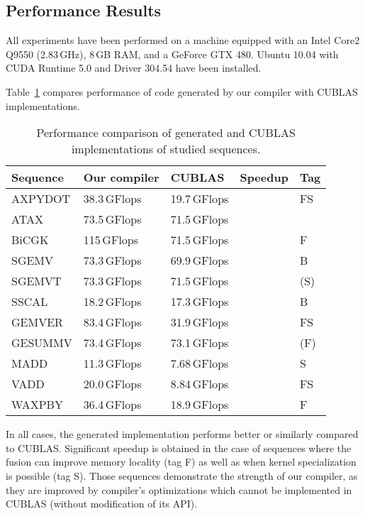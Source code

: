 \documentclass[final]{siamltex}
\begin{document}
{\subsection{Performance Results}

All experiments have been performed on a machine equipped with an Intel Core2 Q9550 (2.83\,GHz), 8\,GB RAM, and a GeForce GTX 480. Ubuntu 10.04 with CUDA Runtime 5.0 and Driver 304.54 have been installed.

Table~\ref{tab:perf} compares performance of code generated by our compiler with CUBLAS implementations.

\begin{table}
        \centering
	\small
        \begin{tabular}{|l|l|l|l|l|}
                \hline
                Sequence & Our compiler & CUBLAS & Speedup & Tag \\
		\hline
                AXPYDOT & 38.3\,GFlops & 19.7\,GFlops &  & FS \\
                ATAX & 73.5\,GFlops & 71.5\,GFlops &  &  \\
                BiCGK & 115\,GFlops & 71.5\,GFlops &  & F \\
                SGEMV & 73.3\,GFlops & 69.9\,GFlops &  & B \\
                SGEMVT & 73.3\,GFlops & 71.5\,GFlops &  & (S) \\
                SSCAL & 18.2\,GFlops & 17.3\,GFlops &  & B \\
                GEMVER & 83.4\,GFlops & 31.9\,GFlops &  & FS \\
                GESUMMV & 73.4\,GFlops & 73.1\,GFlops &  & (F) \\
                MADD & 11.3\,GFlops & 7.68\,GFlops &  & S \\
                VADD & 20.0\,GFlops & 8.84\,GFlops &  & FS \\
                WAXPBY & 36.4\,GFlops & 18.9\,GFlops &  & F\\
                \hline
        \end{tabular}
        \caption{Performance comparison of generated and CUBLAS implementations of studied sequences.}
        \label{tab:perf}
\end{table}

In all cases, the generated implementation performs better or similarly compared to CUBLAS. Significant speedup is obtained in the case of sequences where the fusion can improve memory locality (tag F) as well as when kernel specialization is possible (tag S). Those sequences demonstrate the strength of our compiler, as they are improved by compiler's optimizations which cannot be implemented in CUBLAS (without modification of its API). 









}
\end{document}
